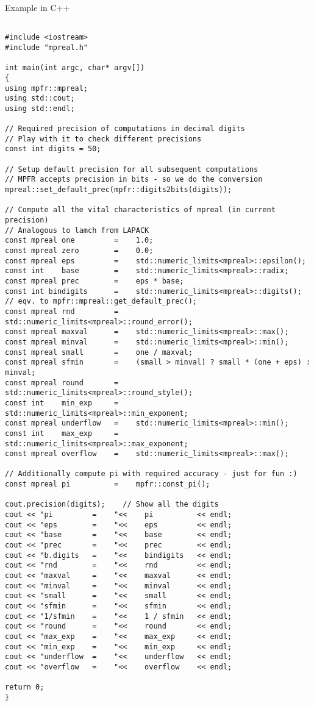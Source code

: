 \vpara
Example in C++


\begin{lstlisting}

#include <iostream>
#include "mpreal.h"

int main(int argc, char* argv[])
{
using mpfr::mpreal;    
using std::cout;
using std::endl;

// Required precision of computations in decimal digits
// Play with it to check different precisions
const int digits = 50; 

// Setup default precision for all subsequent computations
// MPFR accepts precision in bits - so we do the conversion 
mpreal::set_default_prec(mpfr::digits2bits(digits));

// Compute all the vital characteristics of mpreal (in current precision)
// Analogous to lamch from LAPACK
const mpreal one         =    1.0;
const mpreal zero        =    0.0;
const mpreal eps         =    std::numeric_limits<mpreal>::epsilon();
const int    base        =    std::numeric_limits<mpreal>::radix;
const mpreal prec        =    eps * base;
const int bindigits      =    std::numeric_limits<mpreal>::digits(); // eqv. to mpfr::mpreal::get_default_prec();
const mpreal rnd         =    std::numeric_limits<mpreal>::round_error();
const mpreal maxval      =    std::numeric_limits<mpreal>::max();
const mpreal minval      =    std::numeric_limits<mpreal>::min();
const mpreal small       =    one / maxval;
const mpreal sfmin       =    (small > minval) ? small * (one + eps) : minval;
const mpreal round       =    std::numeric_limits<mpreal>::round_style();
const int    min_exp     =    std::numeric_limits<mpreal>::min_exponent;
const mpreal underflow   =    std::numeric_limits<mpreal>::min();
const int    max_exp     =    std::numeric_limits<mpreal>::max_exponent;
const mpreal overflow    =    std::numeric_limits<mpreal>::max();

// Additionally compute pi with required accuracy - just for fun :)
const mpreal pi          =    mpfr::const_pi();

cout.precision(digits);    // Show all the digits
cout << "pi         =    "<<    pi          << endl;    
cout << "eps        =    "<<    eps         << endl;
cout << "base       =    "<<    base        << endl;
cout << "prec       =    "<<    prec        << endl;
cout << "b.digits   =    "<<    bindigits   << endl;
cout << "rnd        =    "<<    rnd         << endl;
cout << "maxval     =    "<<    maxval      << endl;    
cout << "minval     =    "<<    minval      << endl;    
cout << "small      =    "<<    small       << endl;    
cout << "sfmin      =    "<<    sfmin       << endl;    
cout << "1/sfmin    =    "<<    1 / sfmin   << endl;    
cout << "round      =    "<<    round       << endl;    
cout << "max_exp    =    "<<    max_exp     << endl;
cout << "min_exp    =    "<<    min_exp     << endl;
cout << "underflow  =    "<<    underflow   << endl;    
cout << "overflow   =    "<<    overflow    << endl;

return 0;
}

\end{lstlisting}



